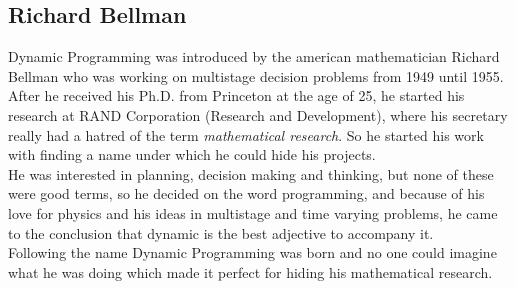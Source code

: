 \documentclass[conference]{IEEEtran}
\begin{document}
\subsection{Richard Bellman}
Dynamic Programming was introduced by the american mathematician Richard Bellman who was working on multistage decision problems from 1949 until 1955. After he received his Ph.D. from Princeton at the age of 25, he started his research at RAND Corporation (Research and Development), where his secretary really had a hatred of the term \textit{mathematical research}. So he started his work with finding a name under which he could hide his projects.
\\
He was interested in planning, decision making and thinking, but none of these were good terms, so he decided on the word programming, and because of his love for physics and his ideas in multistage and time varying problems, he came to the conclusion that dynamic is the best adjective to accompany it.\\
Following the name Dynamic Programming was born and no one could imagine what he was doing which made it perfect for hiding his mathematical research. \cite{Dreyfus.2002}
\end{document}
